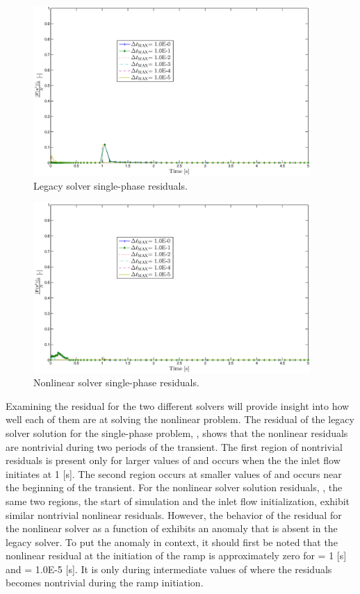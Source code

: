 \begin{figure}[h!t]
\centering
\includegraphics[width=0.94\textwidth]{images/cobra_single_res_v_dt.eps}
\caption{Legacy solver single-phase residuals.}
\label{fig:leg_single_res}
\end{figure}

\begin{figure}[h!t]
\centering
\includegraphics[width=0.94\textwidth]{images/nl_single_res_v_dt.eps}
\caption{Nonlinear solver single-phase residuals.}
\label{fig:nl_single_res}
\end{figure}

Examining the residual for the two different solvers will provide insight into how well each of them are at solving the nonlinear problem.
The residual of the legacy solver solution for the single-phase problem, , shows that the nonlinear residuals are nontrivial during two periods of the transient.
The first region of nontrivial residuals is present only for larger values of \dtmax{} and occurs when the the inlet flow initiates at 1 [s].
The second region occurs at smaller values of \dtmax{} and occurs near the beginning of the transient.
For the nonlinear solver solution residuals, , the same two regions, the start of simulation and the inlet flow initialization, exhibit similar nontrivial nonlinear residuals.
However, the behavior of the residual for the nonlinear solver as a function of \dtmax{} exhibits an anomaly that is absent in the legacy solver.
To put the anomaly in context, it should first be noted that the nonlinear residual at the initiation of the ramp is approximately zero for \dtmax{} = 1 [s] and \dtmax{} = 1.0E-5 [s].
It is only during intermediate values of \dtmax{} where the residuals becomes nontrivial during the ramp initiation.

